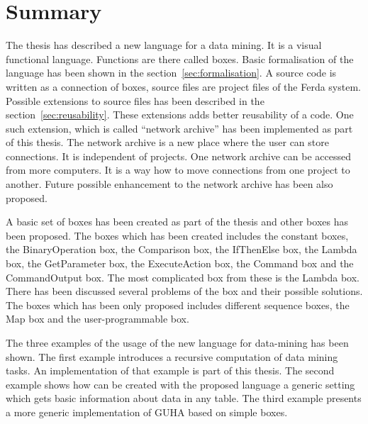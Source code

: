 \documentclass[a4paper,12pt]{book}
\begin{document}
\chapter{Summary}
The thesis has described a new language for a data mining. It is a visual functional language. Functions are there called boxes. Basic formalisation of the language has been shown in the section~\ref{sec:formalisation}. A source code is written as a connection of boxes, source files are project files of the Ferda system. Possible extensions to source files has been described in the section~\ref{sec:reusability}. These extensions adds better reusability of a code. One such extension, which is called ``network archive'' has been implemented as part of this thesis. The network archive is a new place where the user can store connections. It is independent of projects. One network archive can be accessed from more computers. It is a way how to move connections from one project to another. Future possible enhancement to the network archive has been also proposed.

A basic set of boxes has been created as part of the thesis and other boxes has been proposed. The boxes which has been created includes the constant boxes, the BinaryOperation box, the Comparison box, the IfThenElse box, the Lambda box, the GetParameter box, the ExecuteAction box, the Command box and the CommandOutput box. The most complicated box from these is the Lambda box. There has been discussed several problems of the box and their possible solutions. The boxes which has been only proposed includes different sequence boxes, the Map box and the user-programmable box.

The three examples of the usage of the new language for data-mining has been shown. The first example introduces a recursive computation of data mining tasks. An implementation of that example is part of this thesis. The second example shows how can be created with the proposed language a generic setting which gets basic information about data in any table. The third example presents a more generic implementation of GUHA based on simple boxes.



%
%
\end{document}
